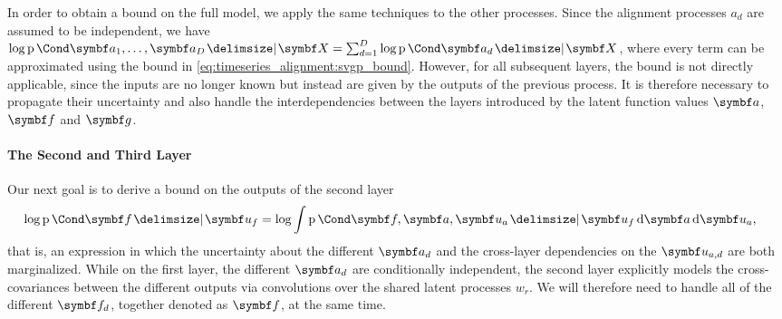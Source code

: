 In order to obtain a bound on the full model, we apply the same techniques to the other processes.
Since the alignment processes $a_d$ are assumed to be independent, we have $\log \Prob{\rv{a_1}, \dots, \rv{a_D} \given \mat{X}} = \sum_{d=1}^D \log \Prob{\rv{a_d} \given \mat{X}}$, where every term can be approximated using the bound in \cref{eq:timeseries_alignment:svgp_bound}.
However, for all subsequent layers, the bound is not directly applicable, since the inputs are no longer known but instead are given by the outputs of the previous process.
It is therefore necessary to propagate their uncertainty and also handle the interdependencies between the layers introduced by the latent function values $\rv{a}$, $\rv{f}$ and $\rv{g}$.

\paragraph{The Second and Third Layer}
\label{sub:timeseries_alignment:other_layers}
Our next goal is to derive a bound on the outputs of the second layer
\begin{align}
    \begin{split}
        \log \Prob{\rv{f} \given \mat{u_f}} &= \log \int \Prob{\rv{f}, \rv{a}, \mat{u_a} \given \mat{u_f}} \diff \rv{a} \diff \mat{u_a},
    \end{split}
\end{align}
that is, an expression in which the uncertainty about the different $\rv{a_d}$  and the cross-layer dependencies on the $\rv{u_{a, d}}$ are both marginalized.
While on the first layer, the different $\rv{a_d}$ are conditionally independent, the second layer explicitly models the cross-covariances between the different outputs via convolutions over the shared latent processes $w_r$.
We will therefore need to handle all of the different $\rv{f_d}$, together denoted as $\rv{f}$, at the same time.

